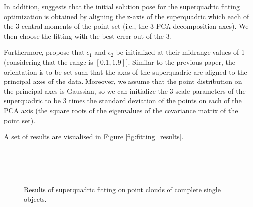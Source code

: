 \documentclass{article}
\begin{document}
In addition, \cite{conf/icra/BiegelbauerV07} suggests that the initial solution pose for the superquadric fitting optimization is obtained by aligning the z-axis of the superquadric which each of the 3 central moments of the point set (i.e., the 3 PCA decomposition axes). We then choose the fitting with the best error out of the 3.

Furthermore, \cite{xiao2005building} propose that $\epsilon_1$ and $\epsilon_2$ be initialized at their midrange values of 1 (considering that the range is $[0.1, 1.9]$). Similar to the previous paper, the orientation is to be set such that the axes of the superquadric are aligned to the principal axes of the data. Moreover, we assume that the point distribution on the principal axes is Gaussian, so we can initialize the 3 scale parameters of the superquadric to be 3 times the standard deviation of the points on each of the PCA axis (the square roots of the eigenvalues of the covariance matrix of the point set).

A set of results are visualized in Figure \ref{fig:fitting_results}.

\begin{figure}
\centering
{} \\
 \\
 \\

\caption {Results of superquadric fitting on point clouds of complete single objects.}
\label{fitting_results}
\end{figure}
\end{document}
